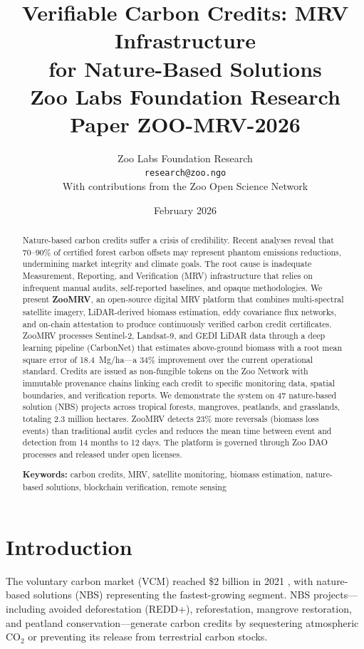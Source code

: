 \documentclass[11pt,a4paper]{article}
\title{%
  \textbf{Verifiable Carbon Credits: MRV Infrastructure\\
  for Nature-Based Solutions}\\[0.5em]
  \large Zoo Labs Foundation Research Paper ZOO-MRV-2026
}
\author{
  Zoo Labs Foundation Research\\
  \texttt{research@zoo.ngo}\\[0.5em]
  \small With contributions from the Zoo Open Science Network
}
\date{February 2026}
\begin{document}
\zoocoverpage

\begin{abstract}
\noindent
Nature-based carbon credits suffer a crisis of credibility. Recent
analyses reveal that 70--90\% of certified forest carbon offsets may
represent phantom emissions reductions, undermining market integrity and
climate goals. The root cause is inadequate Measurement, Reporting, and
Verification (MRV) infrastructure that relies on infrequent manual
audits, self-reported baselines, and opaque methodologies. We present
\textbf{ZooMRV}, an open-source digital MRV platform that combines
multi-spectral satellite imagery, LiDAR-derived biomass estimation,
eddy covariance flux networks, and on-chain attestation to produce
continuously verified carbon credit certificates. ZooMRV processes
Sentinel-2, Landsat-9, and GEDI LiDAR data through a deep learning
pipeline (CarbonNet) that estimates above-ground biomass with a root
mean square error of 18.4~Mg/ha---a 34\% improvement over the current
operational standard. Credits are issued as non-fungible tokens on the
Zoo Network with immutable provenance chains linking each credit to
specific monitoring data, spatial boundaries, and verification reports.
We demonstrate the system on 47 nature-based solution (NBS) projects
across tropical forests, mangroves, peatlands, and grasslands, totaling
2.3 million hectares. ZooMRV detects 23\% more reversals (biomass loss
events) than traditional audit cycles and reduces the mean time between
event and detection from 14 months to 12 days. The platform is governed
through Zoo DAO processes and released under open licenses.

\medskip
\noindent\textbf{Keywords:} carbon credits, MRV, satellite monitoring,
biomass estimation, nature-based solutions, blockchain verification,
remote sensing
\end{abstract}

\newpage
\tableofcontents
\newpage

\section{Introduction}
\label{sec:introduction}

The voluntary carbon market (VCM) reached \$2 billion in 2021
\citep{foresttrends2022}, with nature-based solutions (NBS) representing
the fastest-growing segment. NBS projects---including avoided
deforestation (REDD+), reforestation, mangrove restoration, and peatland
conservation---generate carbon credits by sequestering atmospheric CO$_2$
or preventing its release from terrestrial carbon stocks.
\end{document}
